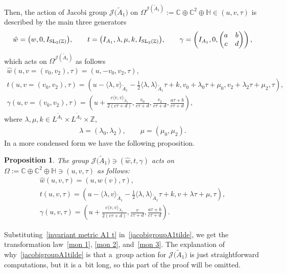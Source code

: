 \documentclass[10pt,a4paper]{amsart}
\numberwithin{equation}{section}
\newtheorem{Proposition}[Theorem]{Proposition}
 { \theoremstyle{definition}
\newtheorem{Definition}[Theorem]{Definition}
\newtheorem{Remark}[Theorem]{Remark} }
\newcommand{\Ja}{\mathcal{J}}
\begin{document}
Then, the action of Jacobi group $\Ja\big(\tilde A_1\big)$ on $\Omega^{\Ja(\tilde A_1)}:=\mathbb{C}\oplus \mathbb{C}^{2}\oplus \mathbb{H} \in (u,v,\tau)$ is described by the main three generators
\begin{gather*}
\hat w=\big(w,0,I_{{\rm SL}_2(\mathbb{Z})}\big),\qquad
 t=\big(I_{A_1},\lambda,\mu,k,I_{{\rm SL}_2(\mathbb{Z})}\big),\qquad
\gamma=\left(I_{A_1},0,\begin{pmatrix}
a & b \\c & d\\\end{pmatrix}\right),
\end{gather*}
 which acts on $\Omega^{\Ja(\tilde A_1)}$ as follows
\begin{gather*}
\hat w(u,v=(v_0,v_2),\tau)= (u,-v_0,v_2,\tau ),
\\[-.5ex]
t(u,v=(v_0,v_2),\tau)=\left(u-\langle \lambda,v \rangle_{\tilde A_1}-\frac{1}{2}\langle \lambda,\lambda \rangle_{\tilde A_1}\tau+k,v_0+\lambda_0\tau+\mu_0,v_2+\lambda_2\tau+\mu_2,\tau\right),
\\[-.5ex]
\gamma(u,v=(v_0,v_2),\tau)=\left(u+\frac{c\langle v,v \rangle_{\tilde A_1}}{2(c\tau+d)},\frac{v_0}{c\tau+d},\frac{v_2}{c\tau+d},\frac{a\tau+b}{c\tau+d}\right),
\end{gather*}
where $\lambda,\mu, k \in L^{\tilde A_1}\times L^{\tilde A_1}\times \mathbb{Z}$,
\begin{gather*}
\lambda=(\lambda_0,\lambda_2), \qquad \mu=(\mu_0,\mu_2).
\end{gather*}
In a more condensed form we have the following proposition.
\begin{Proposition}
The group $\Ja\big(\tilde A_1\big)\ni (\hat w,t,\gamma)$ acts on $\Omega:=\mathbb{C}\oplus \mathbb{C}^{2}\oplus \mathbb{H} \ni (u,v,\tau)$ as follows:
\begin{gather}
\hat w(u,v,\tau)=(u,w(v),\tau),\nonumber
\\[-.5ex]
t(u,v,\tau)=\left(u-\langle \lambda,v \rangle_{\tilde A_1}-\frac{1}{2}\langle \lambda,\lambda \rangle_{\tilde A_1}\tau+k,v+\lambda\tau+\mu,\tau\right),\nonumber
\\[-.5ex]
\gamma(u,v,\tau)=\left(u+\frac{c\langle v,v \rangle_{\tilde A_1}}{2(c\tau+d)},\frac{v}{c\tau+d},\frac{a\tau+b}{c\tau+d}\right).
\label{jacobigroupA1tilde}
\end{gather}
\end{Proposition}

Substituting~\eqref{invariant metric A1 t} in~\eqref{jacobigroupA1tilde}, we get the transformation law~\eqref{mon 1}, \eqref{mon 2}, and~\eqref{mon 3}. The explanation of why~\eqref{jacobigroupA1tilde} is that a~group action for $\Ja\big(\tilde A_1\big)$ is just straightforward computations, but it is a~bit long, so this part of the proof will be omitted.
\end{document}
